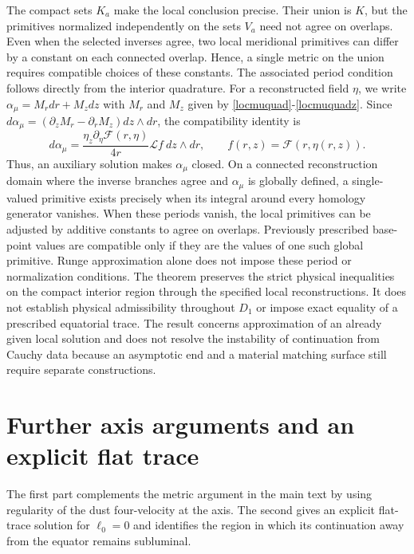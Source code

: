 \documentclass[amsmath,amsfonts,amssymb,aps,pra,superscriptaddress,10pt]{revtex4-2}
\numberwithin{equation}{section}
\theoremstyle{plain}
\theoremstyle{definition}
\theoremstyle{remark}
\theoremstyle{definition}
\newcommand{\ellzero}{\ell_0}
\begin{document}
The compact sets $K_a$ make the local conclusion precise. Their union is $K$, but the primitives normalized independently on the sets $V_a$ need not agree on overlaps. Even when the selected inverses agree, two local meridional primitives can differ by a constant on each connected overlap. Hence, a single metric on the union requires compatible choices of these constants. The associated period condition follows directly from the interior quadrature. For a reconstructed field $\eta$, we write $\alpha_\mu=M_r dr+M_z dz$ with $M_r$ and $M_z$ given by \eqref{locmuquad}-\eqref{locmuquadz}. Since $d\alpha_\mu=(\partial_z M_r-\partial_r M_z)dz\wedge dr$, the compatibility identity is
\begin{equation}
d\alpha_\mu=\frac{\eta_z\partial_\eta\mathcal{F}(r,\eta)}{4r}
\mathcal{L}f~dz\wedge dr,\qquad 
f(r,z)=\mathcal{F}(r,\eta(r,z)).
\end{equation}
Thus, an auxiliary solution makes $\alpha_\mu$ closed. On a connected reconstruction domain where the inverse branches agree and $\alpha_\mu$ is globally defined, a single-valued primitive exists precisely when its integral around every homology generator vanishes. When these periods vanish, the local primitives can be adjusted by additive constants to agree on overlaps. Previously prescribed base-point values are compatible only if they are the values of one such global primitive. Runge approximation alone does not impose these period or normalization conditions. The theorem preserves the strict physical inequalities on the compact interior region through the specified local reconstructions. It does not establish physical admissibility throughout $D_1$ or impose exact equality of a prescribed equatorial trace. The result concerns approximation of an already given local solution and does not resolve the instability of continuation from Cauchy data because an asymptotic end and a material matching surface still require separate constructions.

\section{Further axis arguments and an explicit flat trace} \label{supptraces}

The first part complements the metric argument in the main text by using regularity of the dust four-velocity at the axis. The second gives an explicit flat-trace solution for $\ellzero=0$ and identifies the region in which its continuation away from the equator remains subluminal.
\end{document}
